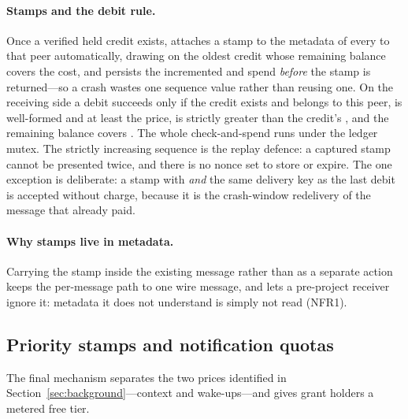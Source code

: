 \paragraph{Stamps and the debit rule.}
Once a verified held credit exists,  attaches a stamp
 to the  metadata of every
 to that peer automatically, drawing on the oldest credit whose
remaining balance covers the cost, and persists the incremented  and spend
\emph{before} the stamp is returned---so a crash wastes one sequence value rather than
reusing one. On the receiving side a debit succeeds only if the credit exists and belongs
to this peer,  is well-formed and at least the  price,
 is strictly greater than the credit's , and the remaining balance
covers . The whole check-and-spend runs under the ledger mutex. The strictly
increasing sequence is the replay defence: a captured stamp cannot be presented twice,
and there is no nonce set to store or expire. The one exception is deliberate: a stamp
with  \emph{and} the same delivery key as the last debit is accepted
without charge, because it is the crash-window redelivery of the message that already
paid.

\paragraph{Why stamps live in  metadata.}
Carrying the stamp inside the existing message rather than as a separate action keeps the
per-message path to one wire message, and lets a pre-project receiver ignore it: metadata
it does not understand is simply not read (NFR1).

\subsection{Priority stamps and notification quotas}
\label{sec:design-priority}

The final mechanism separates the two prices identified in
Section~\ref{sec:background}---context and wake-ups---and gives grant holders a metered
free tier.

